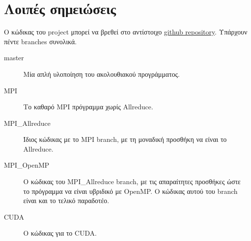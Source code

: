 \clearpage
\section{Λοιπές σημειώσεις}
Ο κώδικας του project μπορεί να βρεθεί στο αντίστοιχο \href{https://github.com/vasra/GameOfLife}{github repository}. Υπάρχουν πέντε branches συνολικά. 
\begin{description}
\item[master] Μία απλή υλοποίηση του ακολουθιακού προγράμματος.
\item[MPI] Το καθαρό MPI πρόγραμμα χωρίς Allreduce.
\item[MPI\_Allreduce] Ίδιος κώδικας με το MPI branch, με τη μοναδική προσθήκη να είναι το Allreduce.
\item[MPI\_OpenMP] Ο κώδικας του MPI\_Allreduce branch, με τις απαραίτητες προσθήκες ώστε το πρόγραμμα να είναι υβριδικό με OpenMP. Ο κώδικας αυτού του branch είναι και το τελικό παραδοτέο.
\item[CUDA] Ο κώδικας για το CUDA.
\end{description}